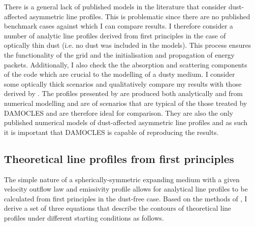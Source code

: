 There is a general lack of published models in the literature that consider dust-affected asymmetric line profiles.  This is problematic since there are no published benchmark cases against which I can compare results.  I therefore consider a number of analytic line profiles derived from first principles in the case of optically thin dust (i.e. no dust was included in the models).  This process ensures the functionality of the grid and the initialisation and propagation of energy packets.  Additionally, I also check the the absorption and scattering components of the code which are crucial to the modelling of a dusty medium.  I  consider some optically thick scenarios and qualitatively compare my results with those derived by \citet{Lucy1989}.  The profiles presented by  \citet{Lucy1989} are produced both analytically and from numerical modelling and are of scenarios that are typical of the those treated by DAMOCLES and are therefore ideal for comparison.  They are also the only published numerical models of dust-affected asymmetric line profiles and as such it is important that DAMOCLES is capable of reproducing the results.

\subsection{Theoretical line profiles from first principles}
\label{analytics}

The simple nature of a spherically-symmetric expanding medium with a given velocity outflow law and emissivity profile allows for analytical line profiles to be calculated from first principles in the dust-free case.  Based on the methods of \cite{Gerasimovic1933},  I derive a set of three equations that describe the contours of theoretical line profiles under different starting conditions as follows.

